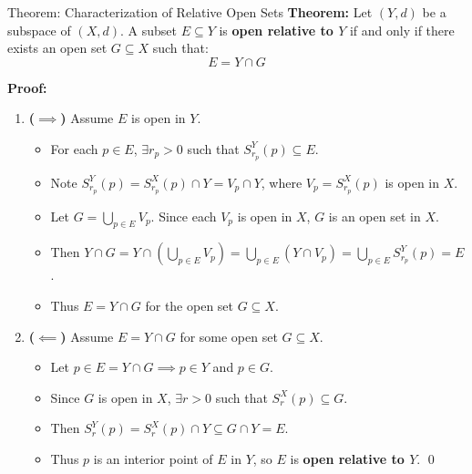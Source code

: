 \documentclass[11pt,a4paper]{article}
\begin{document}
\begin{exbox}{Theorem: Characterization of Relative Open Sets}
\textbf{Theorem:} Let $(Y, d)$ be a subspace of $(X, d)$. A subset $E \subseteq Y$ is \textbf{open relative to $Y$} if and only if there exists an open set $G \subseteq X$ such that:
\begin{equation}
    E = Y \cap G
\end{equation}

\textbf{Proof:}
\begin{enumerate}
    \item \textbf{($\implies$)} Assume $E$ is open in $Y$.
    \begin{itemize}
        \item For each $p \in E$, $\exists r_p > 0$ such that $S_{r_p}^Y(p) \subseteq E$.
        \item Note $S_{r_p}^Y(p) = S_{r_p}^X(p) \cap Y = V_p \cap Y$, where $V_p = S_{r_p}^X(p)$ is open in $X$.
        \item Let $G = \bigcup_{p \in E} V_p$. Since each $V_p$ is open in $X$, $G$ is an open set in $X$.
        \item Then $Y \cap G = Y \cap \left(\bigcup_{p \in E} V_p\right) = \bigcup_{p \in E} (Y \cap V_p) = \bigcup_{p \in E} S_{r_p}^Y(p) = E$.
        \item Thus $E = Y \cap G$ for the open set $G \subseteq X$.
    \end{itemize}
    \item \textbf{($\impliedby$)} Assume $E = Y \cap G$ for some open set $G \subseteq X$.
    \begin{itemize}
        \item Let $p \in E = Y \cap G \implies p \in Y$ and $p \in G$.
        \item Since $G$ is open in $X$, $\exists r > 0$ such that $S_r^X(p) \subseteq G$.
        \item Then $S_r^Y(p) = S_r^X(p) \cap Y \subseteq G \cap Y = E$.
        \item Thus $p$ is an interior point of $E$ in $Y$, so $E$ is \textbf{open relative to $Y$}. \qed
    \end{itemize}
\end{enumerate}
\end{exbox}
\end{document}

